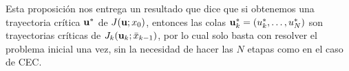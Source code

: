 Esta proposición nos entrega un resultado que dice que si obtenemos una trayectoria crítica \(\mathbf{u}^{\ast}\) de \(J(\mathbf{u}; x_{0})\), entonces las colas \(\mathbf{u}_{k}^{\ast} = (u_{k}^{\ast}, \dotsc, u_{N}^{\ast})\) son trayectorias críticas de \(J_{k}(\mathbf{u}_{k}; \bar{x}_{k-1})\), por lo cual solo basta con resolver el problema inicial una vez, sin la necesidad de hacer las \(N\) etapas como en el caso de CEC.
